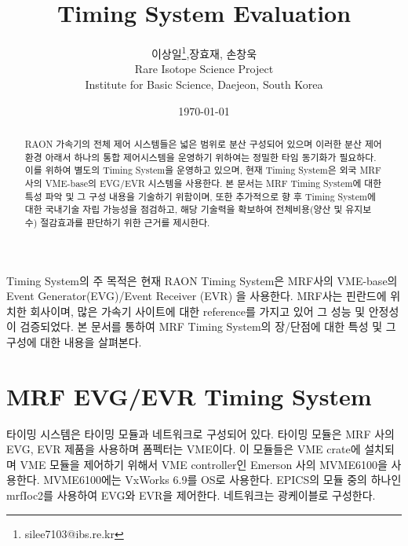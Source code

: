 \documentclass[11pt
  , a4paper
  , article
  , oneside
]{memoir}
\begin{document}
\newcommand{\technumber}{
  RAON Control-Document Series\\
  Revision : v1.0,   Release : 2016-03-14 fixed date}
\title{\textbf{Timing System Evaluation}}

\author{이상일\thanks{silee7103@ibs.re.kr},장효재, 손창욱 \\

  Rare Isotope Science Project\\
  Institute for Basic Science, Daejeon, South Korea
}
\date{\today}

\renewcommand{\maketitlehooka}{\begin{flushright}\textsf{\technumber}\end{flushright}}

\maketitle

\begin{abstract}
RAON 가속기의 전체 제어 시스템들은 넓은 범위로 분산 구성되어 있으며 이러한 분산 제어환경 아래서 하나의 통합 제어시스템을 운영하기 위하여는 정밀한 타임 동기화가 필요하다. 이를 위하여 별도의 Timing System을 운영하고 있으며, 현재 Timing System은 외국 MRF 사의 VME-base의 EVG/EVR 시스템을 사용한다. 본 문서는 MRF Timing System\cite{mrf}에 대한 특성 파악 및 그 구성 내용을 기술하기 위함이며, 또한 추가적으로 향 후 Timing System에 대한 국내기술 자립 가능성을 점검하고, 해당 기술력을 확보하여 전체비용(양산 및 유지보수) 절감효과를 판단하기 위한 근거를 제시한다.
\end{abstract}
Timing System의 주 목적은 
현재 RAON Timing System은 MRF사의 VME-base의 Event Generator(EVG)\cite{evg}/Event Receiver (EVR)\cite{evr} 을 사용한다. MRF사는 핀란드에 위치한 회사이며, 많은 가속기 사이트에 대한 reference를 가지고 있어 그 성능 및 안정성이 검증되었다. 본 문서를 통하여 MRF Timing System의 장/단점에 대한 특성 및 그 구성에 대한 내용을 살펴본다.

\chapter{MRF EVG/EVR Timing System}
타이밍 시스템은 타이밍 모듈과 네트워크로 구성되어 있다. 타이밍 모듈은 MRF 사의 EVG, EVR 제품을 사용하며 폼펙터는 VME이다. 이 모듈들은 VME crate에 설치되며 VME 모듈을 제어하기 위해서 VME controller인 Emerson 사의 MVME6100을 사용한다. MVME6100에는 VxWorks 6.9를 OS로 사용한다. EPICS의 모듈 중의 하나인 mrfIoc2를 사용하여 EVG와 EVR을 제어한다. 네트워크는 광케이블로 구성한다. 
\end{document}

